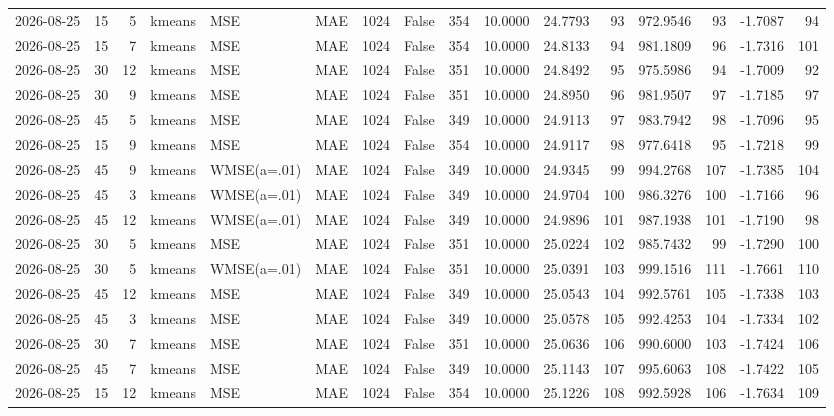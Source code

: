 \documentclass[10pt]{article}
\begin{document}
\begin{landscape}
\begin{longtable}{@{}lrrlllrcrrrrrrrr@{}}
2026-08-25 & 15 & 5 & kmeans & MSE & MAE & 1024 & False & 354 & 10.0000 & 24.7793 & 93 & 972.9546 & 93 & -1.7087 & 94 \\
2026-08-25 & 15 & 7 & kmeans & MSE & MAE & 1024 & False & 354 & 10.0000 & 24.8133 & 94 & 981.1809 & 96 & -1.7316 & 101 \\
2026-08-25 & 30 & 12 & kmeans & MSE & MAE & 1024 & False & 351 & 10.0000 & 24.8492 & 95 & 975.5986 & 94 & -1.7009 & 92 \\
2026-08-25 & 30 & 9 & kmeans & MSE & MAE & 1024 & False & 351 & 10.0000 & 24.8950 & 96 & 981.9507 & 97 & -1.7185 & 97 \\
2026-08-25 & 45 & 5 & kmeans & MSE & MAE & 1024 & False & 349 & 10.0000 & 24.9113 & 97 & 983.7942 & 98 & -1.7096 & 95 \\
2026-08-25 & 15 & 9 & kmeans & MSE & MAE & 1024 & False & 354 & 10.0000 & 24.9117 & 98 & 977.6418 & 95 & -1.7218 & 99 \\
2026-08-25 & 45 & 9 & kmeans & WMSE(a=.01) & MAE & 1024 & False & 349 & 10.0000 & 24.9345 & 99 & 994.2768 & 107 & -1.7385 & 104 \\
2026-08-25 & 45 & 3 & kmeans & WMSE(a=.01) & MAE & 1024 & False & 349 & 10.0000 & 24.9704 & 100 & 986.3276 & 100 & -1.7166 & 96 \\
2026-08-25 & 45 & 12 & kmeans & WMSE(a=.01) & MAE & 1024 & False & 349 & 10.0000 & 24.9896 & 101 & 987.1938 & 101 & -1.7190 & 98 \\
2026-08-25 & 30 & 5 & kmeans & MSE & MAE & 1024 & False & 351 & 10.0000 & 25.0224 & 102 & 985.7432 & 99 & -1.7290 & 100 \\
2026-08-25 & 30 & 5 & kmeans & WMSE(a=.01) & MAE & 1024 & False & 351 & 10.0000 & 25.0391 & 103 & 999.1516 & 111 & -1.7661 & 110 \\
2026-08-25 & 45 & 12 & kmeans & MSE & MAE & 1024 & False & 349 & 10.0000 & 25.0543 & 104 & 992.5761 & 105 & -1.7338 & 103 \\
2026-08-25 & 45 & 3 & kmeans & MSE & MAE & 1024 & False & 349 & 10.0000 & 25.0578 & 105 & 992.4253 & 104 & -1.7334 & 102 \\
2026-08-25 & 30 & 7 & kmeans & MSE & MAE & 1024 & False & 351 & 10.0000 & 25.0636 & 106 & 990.6000 & 103 & -1.7424 & 106 \\
2026-08-25 & 45 & 7 & kmeans & MSE & MAE & 1024 & False & 349 & 10.0000 & 25.1143 & 107 & 995.6063 & 108 & -1.7422 & 105 \\
2026-08-25 & 15 & 12 & kmeans & MSE & MAE & 1024 & False & 354 & 10.0000 & 25.1226 & 108 & 992.5928 & 106 & -1.7634 & 109 \\

\end{longtable}
\end{landscape}
\end{document}

